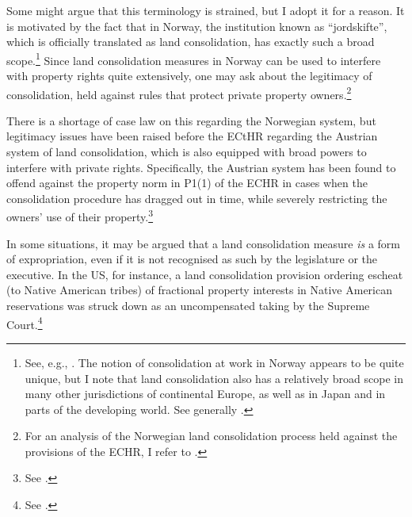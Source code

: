 Some might argue that this terminology is strained, but I adopt it for a reason. It is motivated by the fact that in Norway, the institution known as ``jordskifte'', which is officially translated as land consolidation, has exactly such a broad scope.\footnote{See, e.g., \cite{reiten09,rognes03}. The notion of consolidation at work in Norway appears to be quite unique, but I note that land consolidation also has a relatively broad scope in many other jurisdictions of continental Europe, as well as in Japan and in parts of the developing world. See generally \cite{sky07,vitikainen04}.} Since land consolidation measures in Norway can be used to interfere with property rights quite extensively, one may ask about the legitimacy of consolidation, held against rules that protect private property owners.\footnote{For an analysis of the Norwegian land consolidation process held against the provisions of the ECHR, I refer to \cite{utgard09}.} 

There is a shortage of case law on this regarding the Norwegian system, but legitimacy issues have been raised before the ECtHR regarding the Austrian system of land consolidation, which is also equipped with broad powers to interfere with private rights. Specifically, the Austrian system has been found to offend against the property norm in P1(1) of the ECHR in cases when the consolidation procedure has dragged out in time, while severely restricting the owners' use of their property.\footnote{See \cite{erkner87,poiss87}.} 

In some situations, it may be argued that a land consolidation measure {\it is} a form of expropriation, even if it is not recognised as such by the legislature or the executive. In the US, for instance, a land consolidation provision ordering escheat (to Native American tribes) of fractional property interests in Native American reservations was struck down as an uncompensated taking by the Supreme Court.\footnote{See \cite{hodel87}.}

